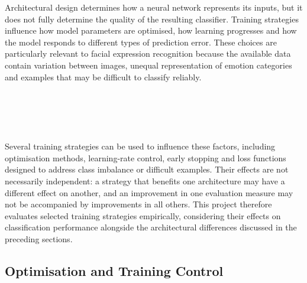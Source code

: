 \documentclass[12pt, a4paper]{report}
\let\oldsubsection\subsection
\renewcommand{\subsection}{%
    \Needspace{6\baselineskip}%
    \oldsubsection
}
\begin{document}
			Architectural design determines how a neural network represents its inputs, but it does not fully determine the quality of the resulting classifier. Training strategies influence how model parameters are optimised, how learning progresses and how the model responds to different types of prediction error. These choices are particularly relevant to facial expression recognition because the available data contain variation between images, unequal representation of emotion categories and examples that may be difficult to classify reliably.\\\\\\\\\\\\
			Several training strategies can be used to influence these factors, including optimisation methods, learning-rate control, early stopping and loss functions designed to address class imbalance or difficult examples. Their effects are not necessarily independent: a strategy that benefits one architecture may have a different effect on another, and an improvement in one evaluation measure may not be accompanied by improvements in all others. This project therefore evaluates selected training strategies empirically, considering their effects on classification performance alongside the architectural differences discussed in the preceding sections.
			
			\subsection{Optimisation and Training Control}
				
\end{document}
